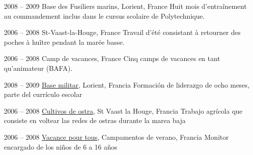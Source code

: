 \item[Commandos Marine]{2008 -- 2009}
	{Base des Fusiliers marins, Lorient, France}
	{Huit mois d'entraînement au commandement inclus dans le cursus scolaire de Polytechnique.}


\item[Ostreiculture]{2006 -- 2008}
	{St-Vaast-la-Houge, France}
	{Travail d'été consistant à retourner des poches à huître pendant la marée basse.}


\item[Animateur]{2006 -- 2008}
	{Camp de vacances, France}
	{Cinq camps de vacances en tant qu'animateur (BAFA).}


\item[Commandos Marine]{2008 -- 2009}
	{
	\href{http://www.defense.gouv.fr/marine/organisation/forces/fusiliers-marins-et-commandos/force-maritime-des-fusiliers-marins-et-commandos}{Base militar}, Lorient, Francia
	}
	{Formación de liderazgo de ocho meses, parte del currículo escolar}

\item[Ostrícultor]{2006 -- 2008}
	{
	\href{http://huitresdesaintvaast.fr/}{Cultivos de ostra}, St Vaast la Houge, Francia
	}
	{Trabajo agrícola que consiste en voltear las redes de ostras durante la marea baja}


\item[Animador]{2006 -- 2008}
	{
	\href{http://www.vacances-pour-tous.org/}{Vacance pour tous}, Campamentos de verano, Francia
	}
	{Monitor encargado de los niños de 6 a 16 años}
	
